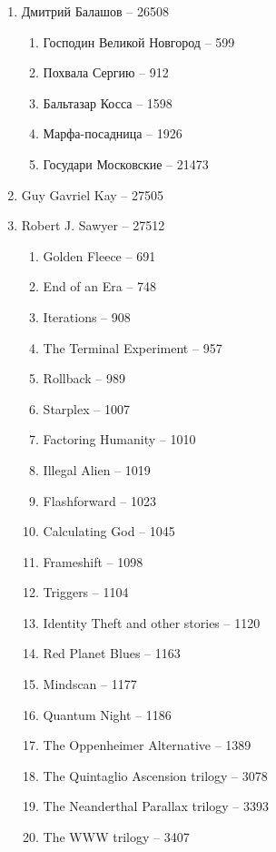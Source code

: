 \documentclass[a4paper, 11pt]{proc} %
\begin{document}
\begin{enumerate}
\begin{enumerate}
        \end{enumerate}
    \item Дмитрий Балашов -- 26508
        \begin{enumerate}
            \item Господин Великой Новгород -- 599
            \item Похвала Сергию -- 912
            \item Бальтазар Косса -- 1598
            \item Марфа-посадница -- 1926
            \item Государи Московские -- 21473
        \end{enumerate}
    \item Guy Gavriel Kay -- 27505
    \item Robert J. Sawyer -- 27512
        \begin{enumerate}
            \item Golden Fleece -- 691
            \item End of an Era -- 748
            \item Iterations -- 908
            \item The Terminal Experiment -- 957
            \item Rollback -- 989
            \item Starplex -- 1007
            \item Factoring Humanity -- 1010
            \item Illegal Alien -- 1019
            \item Flashforward -- 1023
            \item Calculating God -- 1045
            \item Frameshift -- 1098
            \item Triggers -- 1104
            \item Identity Theft and other stories -- 1120
            \item Red Planet Blues -- 1163
            \item Mindscan -- 1177
            \item Quantum Night -- 1186
            \item The Oppenheimer Alternative -- 1389
            \item The Quintaglio Ascension trilogy -- 3078
            \item The Neanderthal Parallax trilogy -- 3393
            \item The WWW trilogy -- 3407
        \end{enumerate}

\end{enumerate}
\end{document}
